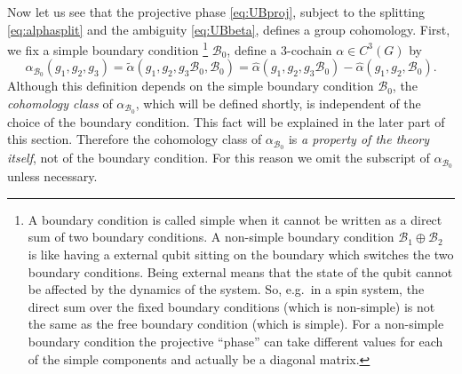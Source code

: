 \documentclass[
]{scrartcl}
\numberwithin{equation}{section}
\theoremstyle{definition}
\theoremstyle{definition}
\theoremstyle{definition}
\theoremstyle{definition}
\theoremstyle{remark}
\begin{document}
Now let us see that the projective phase \eqref{eq:UBproj}, subject to the splitting \eqref{eq:alphasplit} and the ambiguity \eqref{eq:UBbeta}, defines a group cohomology.
First, we fix a simple boundary condition \footnote{A boundary condition is called simple when it cannot be written as a direct sum of two boundary conditions. A non-simple boundary condition \(\mathcal{B}_1\oplus \mathcal{B}_2\) is like having a external qubit sitting on the boundary which switches the two boundary conditions. Being external means that the state of the qubit cannot be affected by the dynamics of the system. So, e.g.~in a spin system, the direct sum over the fixed boundary conditions (which is non-simple) is not the same as the free boundary condition (which is simple). For a non-simple boundary condition the projective ``phase'' can take different values for each of the simple components and actually be a diagonal matrix.} \(\mathcal{B}_0\), define a 3-cochain \(\alpha \in C^3(G)\) by
\begin{equation}
    \label{eq:alphadef}
    \alpha_{\mathcal{B}_0}(g_1,g_2,g_3) = \tilde{\alpha}(g_1,g_2,g_3\mathcal{B}_0,\mathcal{B}_0) = \hat\alpha(g_1,g_2,g_3\mathcal{B}_0) - \hat\alpha(g_1,g_2,\mathcal{B}_0).
\end{equation}
Although this definition depends on the simple boundary condition \(\mathcal{B}_0\), the \emph{cohomology class} of \(\alpha_{\mathcal{B}_0}\), which will be defined shortly, is independent of the choice of the boundary condition. This fact will be explained in the later part of this section. Therefore the cohomology class of \(\alpha_{\mathcal{B}_0}\) is \emph{a property of the theory itself}, not of the boundary condition.
For this reason we omit the subscript of \(\alpha_{\mathcal{B}_0}\) unless necessary.
\end{document}
